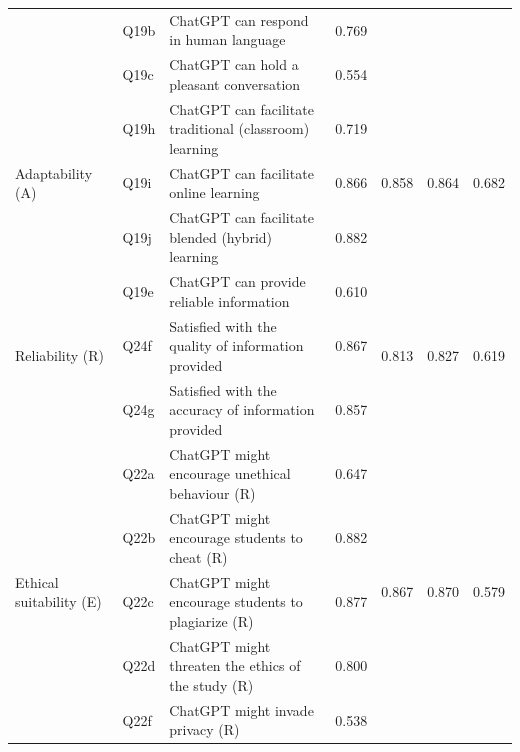 \begin{table}[!htbp]
{\begin{tabular}{p{2.7cm}lp{7.4cm}cccc}
 & Q19b & ChatGPT can respond in human language & 0.769 & & &\\
 & Q19c & ChatGPT can hold a pleasant conversation & 0.554 & & &\\
\midrule
\multirow{3}{*}{\parbox{2.6cm}{Adaptability (A)}} & Q19h & ChatGPT can facilitate traditional (classroom) learning & 0.719 & \multirow{3}{*}{0.858} & \multirow{3}{*}{0.864} & \multirow{3}{*}{0.682}\\
 & Q19i & ChatGPT can facilitate online learning & 0.866 & & &\\
 & Q19j & ChatGPT can facilitate blended (hybrid) learning & 0.882 & & &\\
\midrule
\multirow{3}{*}{\parbox{2.6cm}{Reliability (R)}} & Q19e & ChatGPT can provide reliable information & 0.610 & \multirow{3}{*}{0.813} & \multirow{3}{*}{0.827} & \multirow{3}{*}{0.619}\\
 & Q24f & Satisfied with the quality of information provided & 0.867 & & &\\
 & Q24g & Satisfied with the accuracy of information provided & 0.857 & & &\\
\midrule
\multirow{5}{*}{\parbox{2.6cm}{Ethical suitability (E)}} & Q22a & ChatGPT might encourage unethical behaviour (R) & 0.647 & \multirow{5}{*}{0.867} & \multirow{5}{*}{0.870} & \multirow{5}{*}{0.579}\\
 & Q22b & ChatGPT might encourage students to cheat (R) & 0.882 & & &\\
 & Q22c & ChatGPT might encourage students to plagiarize (R) & 0.877 & & &\\
 & Q22d & ChatGPT might threaten the ethics of the study (R) & 0.800 & & &\\
 & Q22f & ChatGPT might invade privacy (R) & 0.538 & & &\\
\bottomrule
\end{tabular}}
\end{table}

